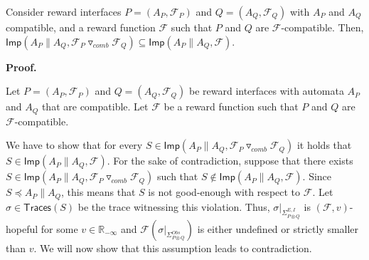 \documentclass[10pt,a4paper]{article}
\begin{document}
 
Consider reward interfaces $P=(A_{P},\mathcal{F}_{P})$ and $Q=(A_{Q},\mathcal{F}_{Q})$ with $A_{P}$ and $A_{Q}$ compatible, and a reward function $\mathcal{F}$ such that $P$ and $Q$ are $\mathcal{F}$-compatible. Then, $\mathsf{Imp}(A_{P}\parallel A_{Q},{{\mathcal{F}_{P}}\mathbin{\triangledown_{\mathit{comb}}}{\mathcal{F}_{Q}}})\subseteq\mathsf{Imp}(A_{P}\parallel A_{Q},\mathcal{F})$.\par
 
 
 
 
 
 
\par\medskip\noindent\textbf{Proof.}\par
 
 
Let $P=(A_{P},\mathcal{F}_{P})$ and $Q=(A_{Q},\mathcal{F}_{Q})$ be reward interfaces with automata $A_{P}$ and $A_{Q}$ that are compatible. Let $\mathcal{F}$ be a reward function such that $P$ and $Q$ are $\mathcal{F}$-compatible.\par
 
 
 
We have to show that for every $S\in\mathsf{Imp}(A_{P}\parallel A_{Q},{{\mathcal{F}_{P}}\mathbin{\triangledown_{\mathit{comb}}}{\mathcal{F}_{Q}}})$ it holds that $S\in\mathsf{Imp}(A_{P}\parallel A_{Q},\mathcal{F})$. For the sake of contradiction, suppose that there exists $S\in\mathsf{Imp}(A_{P}\parallel A_{Q},{{\mathcal{F}_{P}}\mathbin{\triangledown_{\mathit{comb}}}{\mathcal{F}_{Q}}})$ such that $S\not\in\mathsf{Imp}(A_{P}\parallel A_{Q},\mathcal{F})$. Since $S\preceq A_{P}\parallel A_{Q}$, this means that $S$ is not good-enough with respect to $\mathcal{F}$. Let $\sigma\in\mathsf{Traces}(S)$ be the trace witnessing this violation. Thus, $\sigma|_{\Sigma_{P\otimes Q}^{E,I}}$ is $(\mathcal{F},v)$-hopeful for some $v\in\mathbb{R}_{-\infty}$ and $\mathcal{F}(\sigma|_{\Sigma_{P\otimes Q}^{Obs}})$ is either undefined or strictly smaller than $v$. We will now show that this assumption leads to contradiction.\par
 
 
\end{document}
